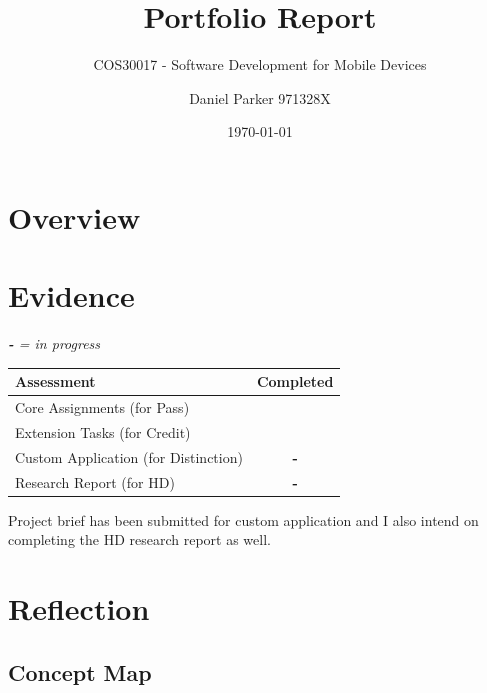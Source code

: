 \documentclass[11pt,english,numbers=endperiod,parskip=half]{scrartcl}
\title{Portfolio Report}
\subtitle{COS30017 - Software Development for Mobile Devices}
\author{Daniel Parker 971328X}
\date{\today}
\newcommand{\cmark}{\ding{51}}
\begin{document}
\maketitle
\thispagestyle{empty}

\section{Overview}


\section{Evidence}
\textit{\textbf{-} = in progress}
  \begin{table}[H]
    \begin{tabular}{|l|c|}
      \hline
      Assessment & Completed \\
      \hline
      Core Assignments (for Pass) & \cmark \\
      \hline
      Extension Tasks (for Credit) & \cmark \\
      \hline
      Custom Application (for Distinction) & \textbf{-} \\
      \hline
      Research Report (for HD) & \textbf{-} \\
      \hline
    \end{tabular}
  \end{table}
  Project brief has been submitted for custom application and I also intend on
  completing the HD research report as well.
\section{Reflection}
  \subsection{Concept Map}
    \begin{figure}[H]
    \\
    \end{figure}
\end{document}
